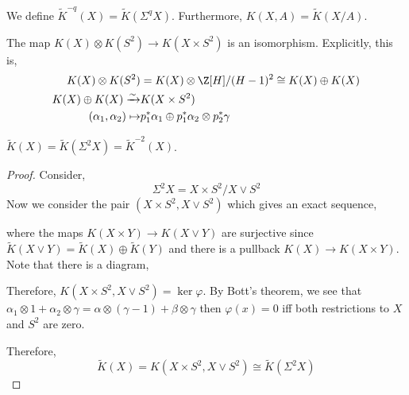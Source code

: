 \documentclass[12pt]{extarticle}
\begin{document}
\begin{defn}
We define $\tilde{K}^{-q}(X) = \tilde{K}(\Sigma^q X)$. Furthermore, $K(X, A) = \tilde{K}(X/A)$.
\end{defn}

\begin{thm}[Bott]
The map $K(X) \otimes K(S^2) \to K(X \times S^2)$ is an isomorphism. Explicitly, this is,
\begin{align*}
K(X) \otimes K(S^2) & = K(X) \otimes \Z[H]/(H-1)^2 \cong K(X) \oplus K(X)
\\
K(X) \oplus K(X) \xrightarrow{\sim} & K(X \times S^2)
\\
(\alpha_1, \alpha_2) \mapsto & p_1^* \alpha_1 \oplus p_1^* \alpha_2 \otimes p_2^* \gamma  
\end{align*}
\end{thm}

\begin{cor}
$\tilde{K}(X) = \tilde{K}(\Sigma^2 X) = \tilde{K}^{-2}(X)$. 
\end{cor}

\begin{proof}
Consider,
\[ \Sigma^2 X = X \times S^2 / X \vee S^2 \]
Now we consider the pair $(X \times S^2, X \vee S^2)$ which gives an exact sequence,
\begin{center}
\end{center}
where the maps $K(X \times Y) \to K(X \vee Y)$ are surjective since $\tilde{K}(X \vee Y) = \tilde{K}(X) \oplus \tilde{K}(Y)$ and there is a pullback $K(X) \to K(X \times Y)$.
Note that there is a diagram,
\begin{center}
\end{center}
Therefore,  $K(X \times S^2, X \vee S^2) = \ker{\varphi}$. By Bott's theorem, we see that $\alpha_1 \otimes 1 + \alpha_2 \otimes \gamma = \alpha \otimes (\gamma - 1) + \beta \otimes \gamma$ then $\varphi(x) = 0$ iff both restrictions to $X$ and $S^2$ are zero. 

Therefore, 
\[ \tilde{K}(X) = K(X \times S^2, X \vee S^2) \cong \tilde{K}(\Sigma^2 X) \]
\end{proof}
\end{document}
